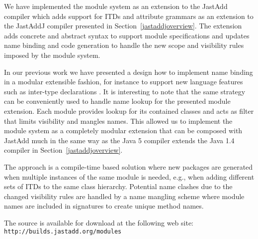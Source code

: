 We have implemented the module system as an extension to the JastAdd
compiler which adds support for ITDs and attribute grammars as an extension
to the JastAddJ compiler presented in Section~\ref{jastaddjoverview}. 
The extension adds concrete and abstract syntax to support module
specifications and updates name binding and code generation to handle the
new scope and visibility rules imposed by the module system. 

In our previous work we have presented a design how to implement name
binding in a modular extensible fashion, for instance to support new
language features such as inter-type declarations
\cite{jastaddjavacompiler}. It is interesting to note that the same
strategy can be conveniently used to handle name lookup for the presented
module extension. Each module provides lookup for its contained classes and
acts as filter that limits visibility and mangles names. This allowed us to
implement the module system as a completely modular extension that can be
composed with JastAdd much in the same way as the Java 5 compiler extends
the Java 1.4 compiler in Section~\ref{jastaddjoverview}.

The approach is a compile-time based solution where new packages are
generated when multiple instances of the same module is needed, e.g., when
adding different sets of ITDs to the same class hierarchy. Potential name
clashes due to the changed visibility rules are handled by a name mangling
scheme where module names are included in signatures to create unique method
names.

The source is available for download at the following web
site: \texttt{http://builds.jastadd.org/modules}
